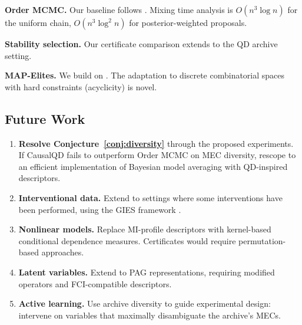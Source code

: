 \documentclass{article}
\theoremstyle{definition}
\theoremstyle{plain}
\theoremstyle{remark}
\begin{document}
\textbf{Order MCMC.} Our baseline follows \citet{friedman2003being}. Mixing time
analysis is $O(n^3 \log n)$ for the uniform chain, $O(n^3 \log^2 n)$ for
posterior-weighted proposals.

\textbf{Stability selection.} Our certificate comparison extends
\citet{meinshausen2010stability} to the QD archive setting.

\textbf{MAP-Elites.} We build on \citet{mouret2015illuminating}. The adaptation
to discrete combinatorial spaces with hard constraints (acyclicity) is novel.

\subsection{Future Work}

\begin{enumerate}
  \item \textbf{Resolve Conjecture~\ref{conj:diversity}} through the proposed
    experiments. If CausalQD fails to outperform Order MCMC on MEC diversity,
    rescope to an efficient implementation of Bayesian model averaging with
    QD-inspired descriptors.
  \item \textbf{Interventional data.} Extend to settings where some interventions
    have been performed, using the GIES framework \citep{hauser2012characterization}.
  \item \textbf{Nonlinear models.} Replace MI-profile descriptors with
    kernel-based conditional dependence measures. Certificates would require
    permutation-based approaches.
  \item \textbf{Latent variables.} Extend to PAG representations, requiring
    modified operators and FCI-compatible descriptors.
  \item \textbf{Active learning.} Use archive diversity to guide experimental
    design: intervene on variables that maximally disambiguate the archive's MECs.
\end{enumerate}
\end{document}
